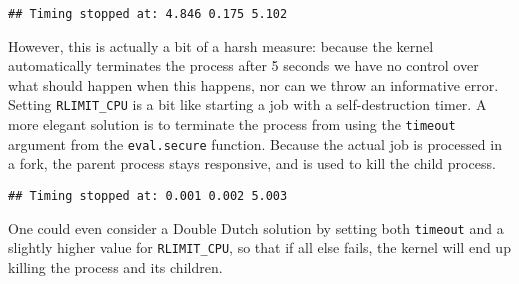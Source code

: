 \begin{appendix}
\begin{knitrout}\mycodesize
{}\color{fgcolor}\begin{kframe}
\begin{alltt}
 \hlkwb{<-} \hlstd{(}\hlstd{(),}  \hlstd{=} \hlstd{))}
\end{alltt}

{\ttfamily\noindent\bfseries\color{errorcolor}{\#\# Error: Terminating process.}}\begin{verbatim}
## Timing stopped at: 4.846 0.175 5.102
\end{verbatim}



\end{kframe}
\end{knitrout}


However, this is actually a bit of a harsh measure: because the kernel
automatically terminates the process after 5 seconds we have no control over
what should happen when this happens, nor can we throw an informative error.
Setting \texttt{RLIMIT\_CPU} is a bit like starting a job with a
self-destruction timer. A more elegant solution is to terminate the process
from \R using the \texttt{timeout} argument from the \texttt{eval.secure}
function. Because the actual job is processed in a fork, the parent process
stays responsive, and is used to kill the child process.

\begin{knitrout}\mycodesize
{}\color{fgcolor}\begin{kframe}
\begin{alltt}
 \hlkwb{<-} \hlstd{(}\hlstd{(),}  \hlstd{=} \hlstd{))}
\end{alltt}


{\ttfamily\noindent\bfseries\color{errorcolor}{\#\# Error: R call did not return within 5 seconds. Terminating process.}}\begin{verbatim}
## Timing stopped at: 0.001 0.002 5.003
\end{verbatim}
\end{kframe}
\end{knitrout}


One could even consider a Double Dutch solution by setting both \texttt{timeout}
and a slightly higher value for \texttt{RLIMIT\_CPU}, so that if all else fails,
the kernel will end up killing the process and its children.


\end{appendix}
